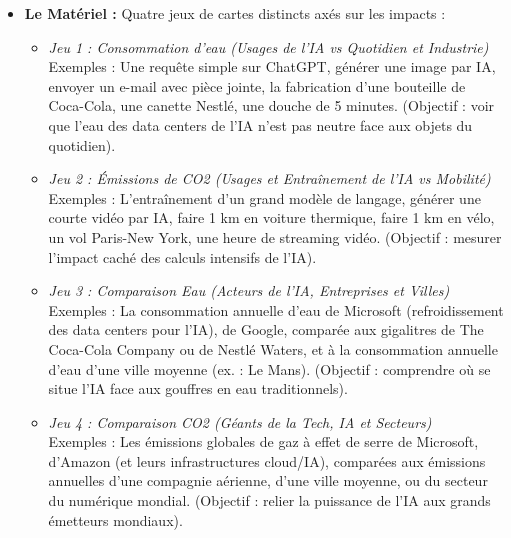 \documentclass[11pt, a4paper]{article}
\begin{document}
\begin{itemize}
    \item \textbf{Le Matériel :} Quatre jeux de cartes distincts axés sur les impacts :
    \begin{itemize}
        \item \textit{Jeu 1 : Consommation d'eau (Usages de l'IA vs Quotidien et Industrie)} \\
        Exemples : Une requête simple sur ChatGPT, générer une image par IA, envoyer un e-mail avec pièce jointe, la fabrication d'une bouteille de Coca-Cola, une canette Nestlé, une douche de 5 minutes. (Objectif : voir que l'eau des data centers de l'IA n'est pas neutre face aux objets du quotidien).
        
        \item \textit{Jeu 2 : Émissions de CO2 (Usages et Entraînement de l'IA vs Mobilité)} \\
        Exemples : L'entraînement d'un grand modèle de langage, générer une courte vidéo par IA, faire 1 km en voiture thermique, faire 1 km en vélo, un vol Paris-New York, une heure de streaming vidéo. (Objectif : mesurer l'impact caché des calculs intensifs de l'IA).

        \item \textit{Jeu 3 : Comparaison Eau (Acteurs de l'IA, Entreprises et Villes)} \\
        Exemples : La consommation annuelle d'eau de Microsoft (refroidissement des data centers pour l'IA), de Google, comparée aux gigalitres de The Coca-Cola Company ou de Nestlé Waters, et à la consommation annuelle d'eau d'une ville moyenne (ex. : Le Mans). (Objectif : comprendre où se situe l'IA face aux gouffres en eau traditionnels).

        \item \textit{Jeu 4 : Comparaison CO2 (Géants de la Tech, IA et Secteurs)} \\
        Exemples : Les émissions globales de gaz à effet de serre de Microsoft, d'Amazon (et leurs infrastructures cloud/IA), comparées aux émissions annuelles d'une compagnie aérienne, d'une ville moyenne, ou du secteur du numérique mondial. (Objectif : relier la puissance de l'IA aux grands émetteurs mondiaux).
    \end{itemize}
    

\end{itemize}
\end{document}
